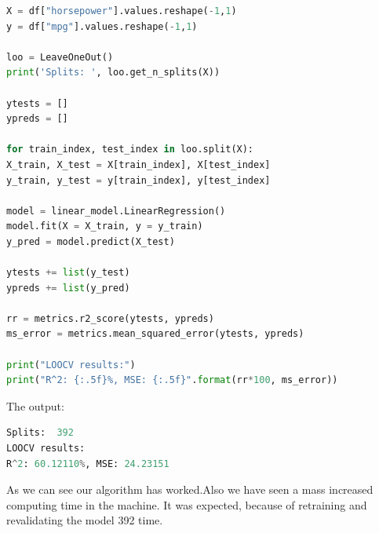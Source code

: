 \begin{lstlisting}[language=Python]
X = df["horsepower"].values.reshape(-1,1)
y = df["mpg"].values.reshape(-1,1) 

loo = LeaveOneOut()
print('Splits: ', loo.get_n_splits(X))

ytests = []
ypreds = []

for train_index, test_index in loo.split(X):
X_train, X_test = X[train_index], X[test_index]
y_train, y_test = y[train_index], y[test_index]

model = linear_model.LinearRegression()
model.fit(X = X_train, y = y_train)
y_pred = model.predict(X_test)

ytests += list(y_test)
ypreds += list(y_pred)

rr = metrics.r2_score(ytests, ypreds)
ms_error = metrics.mean_squared_error(ytests, ypreds)

print("LOOCV results:")
print("R^2: {:.5f}%, MSE: {:.5f}".format(rr*100, ms_error))
\end{lstlisting}

The output:
\begin{lstlisting}[language=Python]
Splits:  392
LOOCV results:
R^2: 60.12110%, MSE: 24.23151
\end{lstlisting}

As we can see our algorithm has worked.Also we have seen a mass increased computing time in the machine. It was expected, because of retraining and revalidating the model 392 time.